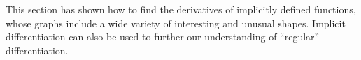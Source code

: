 This section has shown how to find the derivatives of implicitly defined functions, whose graphs include a wide variety of interesting and unusual shapes. Implicit differentiation can also be used to further our understanding of ``regular'' differentiation. 

%
%
%
%
%
